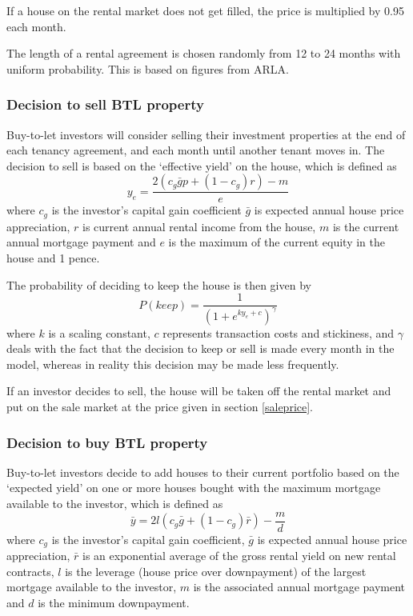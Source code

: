\documentclass{report}
\begin{document}
If a house on the rental market does not get filled, the price is multiplied by 0.95 each month.

The length of a rental agreement is
chosen randomly from 12 to 24 months with uniform probability. This is based on figures from ARLA.

\subsubsection{Decision to sell BTL property}
\label{sellbtl}
Buy-to-let investors will consider selling their investment properties at the end of each tenancy agreement, and each month until another tenant moves in. The decision to sell is based on the `effective yield' on the house, which is defined as
\begin{equation}
y_e = \frac{2(c_g \bar{g}p + (1-c_g)r) - m}{e} 
\end{equation}
where $c_g$ is the investor's capital gain coefficient $\bar{g}$ is expected annual house price appreciation, $r$ is current annual rental income from the house, $m$ is the current annual mortgage payment and $e$ is the maximum of the current equity in the house and 1 pence.

The probability of deciding to keep the house is then given by
\begin{equation}
P(keep) = \frac{1}{(1 + e^{ky_e+c})^\gamma}
\end{equation}
where $k$ is a scaling constant, $c$ represents transaction costs and stickiness, and $\gamma$ deals with the fact that the decision to keep or sell is made every month in the model, whereas in reality this decision may be made less frequently.

If an investor decides to sell, the house will be taken off the rental market and put on the sale market at the price given in section \ref{saleprice}.

\subsubsection{Decision to buy BTL property}
Buy-to-let investors decide to add houses to their current portfolio based on the `expected yield' on one or more houses bought with the maximum mortgage available to the investor, which is defined as
\begin{equation}
\bar{y} = 2l(c_g \bar{g} + (1-c_g)\bar{r}) - \frac{m}{d} 
\end{equation}
where $c_g$ is the investor's capital gain coefficient, $\bar{g}$ is expected annual house price appreciation, $\bar{r}$ is an exponential average of the gross rental yield on new rental contracts, $l$ is the leverage (house price over downpayment) of the largest mortgage available to the investor, $m$ is the associated annual mortgage payment and $d$ is the minimum downpayment.
\end{document}
